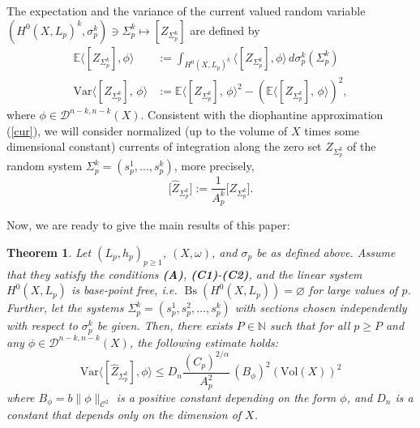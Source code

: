 \documentclass[11pt,leqno,oneside]{amsart}
\newtheorem{thm}{Theorem}[section]
\numberwithin{equation}{section}
\begin{document}
\vspace{5mm}



 The expectation and the  variance of the current valued random variable $(H^{0}(X,L_{p})^{k}, \sigma_{p}^{k})\ni \Sigma_{p}^{k}\longmapsto [Z_{\Sigma_{p}^{k}} ]$ are defined by \begin{align}\label{expvari}
\mathbb{E} \langle[Z_{\Sigma_{p}^{k}}], \phi \rangle &:=\int_{H^{0}(X, L_{p})^{k}}{\langle [Z_{\Sigma_{p}^{k}}], \phi\rangle\, d\sigma_{p}^{k}(\Sigma_{p}^{k})} \\  \mathrm{Var} \langle [Z_{\Sigma_{p}^{k}}], \, \phi \rangle &:= \mathbb{E}\langle [Z_{\Sigma_{p}^{k}}], \, \phi \rangle^{2}- (\mathbb{E}\langle [Z_{\Sigma_{p}^{k}}], \, \phi \rangle)^{2},\end{align} where $\phi\in \mathcal{D}^{n-k, n-k}(X)$.
 Consistent with the diophantine approximation (\ref{cur}), we will consider normalized (up to the volume of $X$ times some dimensional constant) currents of integration along the zero set $Z_{\Sigma_{p}^{k}}$ of the random system $\Sigma_{p}^{k} = (s^{1}_{p}, \ldots, s^{k}_{p})$, more precisely,
  \begin{equation*}
  	\big[\widehat{Z}_{\Sigma_{p}^{k}}\big]:=\frac{1}{A_{p}^{k}}\big[Z_{\Sigma_{p}^{k}}\big].
  \end{equation*}


 Now, we are ready to give the main results of this paper:

\begin{thm}\label{th1}
	Let \( (L_{p}, h_{p})_{p \geq 1} \), \( (X, \omega) \), and \( \sigma_{p} \) be as defined above. Assume that they satisfy the conditions \textbf{(A)}, \textbf{(C1)}-\textbf{(C2)},
and the linear system $H^{0}(X, L_p)$ is base-point free, i.e. $\operatorname{Bs}(H^{0}(X, L_p))=\varnothing$ for large values of $p$. Further, let the systems \( \Sigma^{k}_{p}= (s_{p}^{1}, s_{p}^{2}, \ldots, s_{p}^{k}) \) with sections chosen independently with respect to \( \sigma^{k}_p \) be given. Then, there exists \( P \in \mathbb{N} \) such that for all \( p \geq P \) and any \( \phi \in \mathcal{D}^{n-k, n-k}(X) \), the following estimate holds:
	\begin{equation}\label{mainvar}
			\mathrm{Var}\langle [\widehat{Z}_{\Sigma_{p}^{k}}], \phi \rangle  \leq D_{n} \frac{(C_{p})^{2/\alpha}}{A^{2}_{p}}\,(B_{\phi})^{2}(\mathrm{Vol}(X))^{2}
			 \end{equation}where  $B_{\phi}= b \|\phi\|_{\mathscr{C}^{2}}$ is a positive constant depending on the form $\phi$, and $D_{n}$ is a constant that depends only on the dimension of $X$.
\end{thm}
\end{document}

